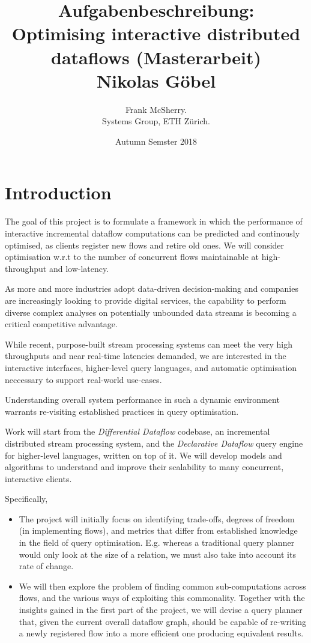 \documentclass[a4paper,10pt]{article}
\date{Autumn Semster 2018}
\title{
  Aufgabenbeschreibung:\\
  Optimising interactive distributed dataflows
  (Masterarbeit)\\
  Nikolas G\"obel
}
\author{
  Frank McSherry. \\
  Systems Group, ETH Z\"urich.
}
\begin{document}
\maketitle

\section{Introduction}

The goal of this project is to formulate a framework in which the
performance of interactive incremental dataflow computations can be
predicted and continously optimised, as clients register new flows and
retire old ones. We will consider optimisation w.r.t to the number of
concurrent flows maintainable at high-throughput and low-latency.

As more and more industries adopt data-driven decision-making and
companies are increasingly looking to provide digital services, the
capability to perform diverse complex analyses on potentially
unbounded data streams is becoming a critical competitive advantage.

While recent, purpose-built stream processing systems can meet the
very high throughputs and near real-time latencies demanded, we are
interested in the interactive interfaces, higher-level query
languages, and automatic optimisation neccessary to support real-world
use-cases.

Understanding overall system performance in such a dynamic environment
warrants re-visiting established practices in query optimisation.

Work will start from the \emph{Differential Dataflow} codebase, an
incremental distributed stream processing system, and the
\emph{Declarative Dataflow} query engine for higher-level languages,
written on top of it. We will develop models and algorithms to
understand and improve their scalability to many concurrent,
interactive clients.

Specifically,

\begin{itemize}

  \item The project will initially focus on identifying trade-offs,
    degrees of freedom (in implementing flows), and metrics that
    differ from established knowledge in the field of query
    optimisation. E.g. whereas a traditional query planner would only
    look at the size of a relation, we must also take into account its
    rate of change.

  \item We will then explore the problem of finding common
    sub-computations across flows, and the various ways of exploiting
    this commonality. Together with the insights gained in the first
    part of the project, we will devise a query planner that, given
    the current overall dataflow graph, should be capable of
    re-writing a newly registered flow into a more efficient one
    producing equivalent results.

\end{itemize}
\end{document}
